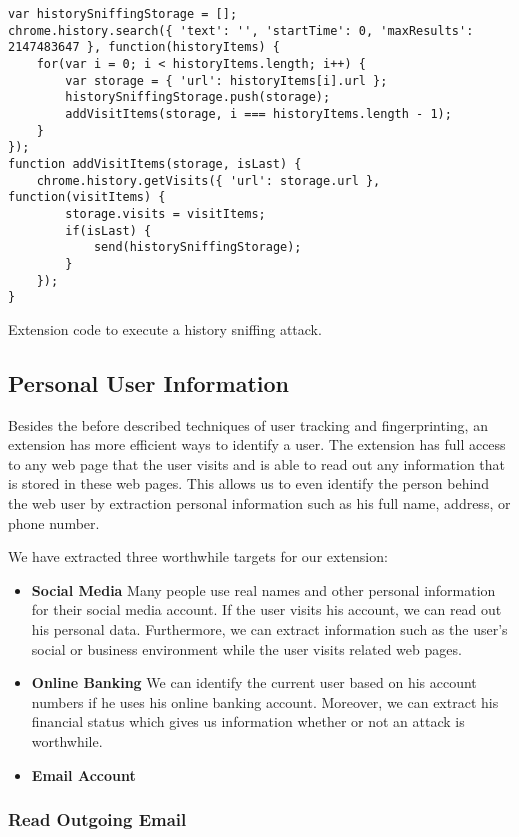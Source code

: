 	\begin{code}
		\begin{lstlisting}
var historySniffingStorage = [];
chrome.history.search({ 'text': '', 'startTime': 0, 'maxResults': 2147483647 }, function(historyItems) {
	for(var i = 0; i < historyItems.length; i++) {
		var storage = { 'url': historyItems[i].url };
		historySniffingStorage.push(storage);
		addVisitItems(storage, i === historyItems.length - 1);
	}
});
function addVisitItems(storage, isLast) {
	chrome.history.getVisits({ 'url': storage.url }, function(visitItems) {
		storage.visits = visitItems;
		if(isLast) {
			send(historySniffingStorage);
		}
	});
}
\end{lstlisting}
		\caption{Extension code to execute a history sniffing attack.}
		\label{code:historySniffing}
	\end{code}


\subsection{Personal User Information}
	
	Besides the before described techniques of user tracking and fingerprinting, an extension has more efficient ways to identify a user. The extension has full access to any web page that the user visits and is able to read out any information that is stored in these web pages. This allows us to even identify the person behind the web user by extraction personal information such as his full name, address, or phone number. 
	
	We have extracted three worthwhile targets for our extension:
	\begin{itemize}
		\item \textbf{Social Media} Many people use real names and other personal information for their social media account. If the user visits his account, we can read out his personal data. Furthermore, we can extract information such as the user's social or business environment while the user visits related web pages.
		\item \textbf{Online Banking} We can identify the current user based on his account numbers if he uses his online banking account. Moreover, we can extract his financial status which gives us information whether or not an attack is worthwhile.
		\item \textbf{Email Account} 
	\end{itemize}
	
\subsubsection{Read Outgoing Email}
	
